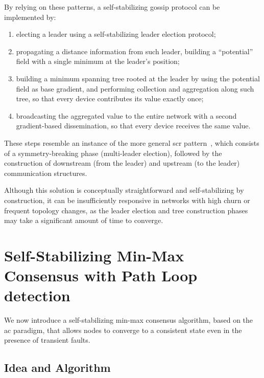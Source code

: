 \documentclass[runningheads]{llncs}
\begin{document}
By relying on these patterns, a self-stabilizing gossip protocol can be implemented by:
\begin{enumerate}
    \item electing a leader using a self-stabilizing leader election protocol;
    \item propagating a distance information from such leader, building a ``potential'' field with a single minimum at the leader's position;
    \item building a minimum spanning tree rooted at the leader by using the potential field as base gradient,
    and performing collection and aggregation along such tree, so that every device contributes its value exactly once;
    \item broadcasting the aggregated value to the entire network with a second gradient-based dissemination, so that every device receives the same value.
\end{enumerate}
%
These steps resemble an instance of the more general \ac{scr} pattern~\cite{FGCS2020-SCR},
which consists of a symmetry-breaking phase (multi-leader election),
followed by the construction of downstream (from the leader) and upstream (to the leader) communication structures.

Although this solution is conceptually straightforward and self-stabilizing by construction,
it can be insufficiently responsive in networks with high churn or frequent topology changes,
as the leader election and tree construction phases may take a significant amount of time to converge.

\section{Self-Stabilizing Min-Max Consensus with Path Loop detection}
\label{sec:aggregate-self-stabilizing-gossip-algorithm}

We now introduce a self-stabilizing min-max consensus algorithm,
based on the \ac{ac} paradigm,
that allows nodes to converge to a consistent state even in the presence of transient faults.

\subsection{Idea and Algorithm}\label{subsec:idea-and-algorithm}
\end{document}

